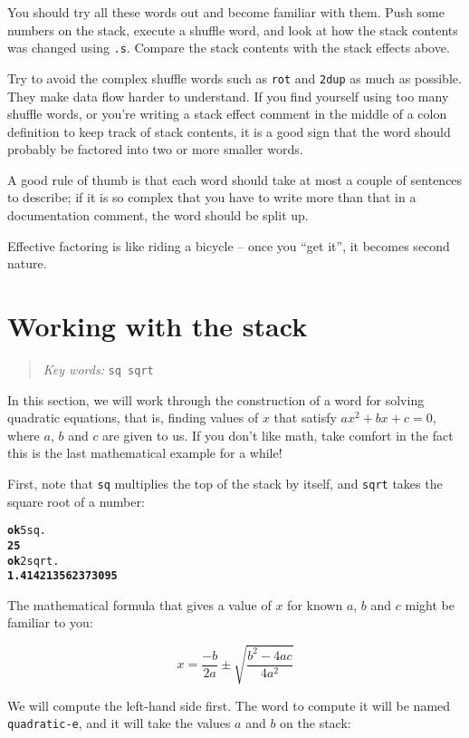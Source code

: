 \documentclass[english]{book}
\newcommand{\chapkeywords}[1]{%
\begin{quote}
\emph{Key words:} \texttt{#1}
\end{quote}
}
\begin{document}
You should try all these words out and become familiar with them. Push some numbers on the stack,
execute a shuffle word, and look at how the stack contents was changed using
\texttt{.s}. Compare the stack contents with the stack effects above.

Try to avoid the complex shuffle words such as \texttt{rot} and \texttt{2dup} as much as possible. They make data flow harder to understand. If you find yourself using too many shuffle words, or you're writing
a stack effect comment in the middle of a colon definition to keep track of stack contents, it is
a good sign that the word should probably be factored into two or
more smaller words.

A good rule of thumb is that each word should take at most a couple of sentences to describe; if it is so complex that you have to write more than that in a documentation comment, the word should be split up.

Effective factoring is like riding a bicycle -- once you ``get it'', it becomes second nature.

\section{Working with the stack}

\chapkeywords{sq sqrt}

In this section, we will work through the construction of a word for solving quadratic equations, that is, finding values of $x$ that satisfy $ax^2+bx+c=0$, where $a$, $b$ and $c$ are given to us. If you don't like math, take comfort in the fact this is the last mathematical example for a while!

First, note that \texttt{sq} multiplies the top of the stack by itself, and \texttt{sqrt} takes the square root of a number:

\begin{alltt}
\textbf{ok} 5 sq .
\textbf{25}
\textbf{ok} 2 sqrt .
\textbf{1.414213562373095}
\end{alltt}

The mathematical formula that gives a value of $x$ for known $a$, $b$ and $c$ might be familiar to you:

$$x=\frac{-b}{2a}\pm\sqrt{\frac{b^2-4ac}{4a^2}}$$

We will compute the left-hand side first. The word to compute it will be named \texttt{quadratic-e}, and it will take the values $a$ and $b$ on the stack:
\end{document}
